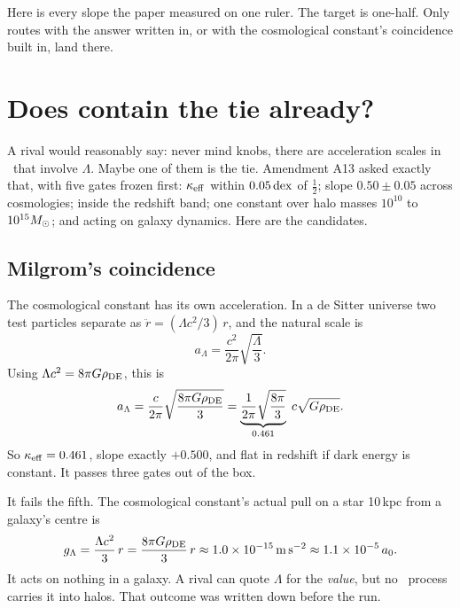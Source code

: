 Here is every slope the paper measured on one ruler. The target is one-half. Only routes with the answer written in, or with the cosmological constant's coincidence built in, land there.





\section{Does \texorpdfstring{\LCDM}{LCDM} contain the tie already?}

A rival would reasonably say: never mind knobs, there are acceleration scales in \LCDM\ that involve $\Lambda$. Maybe one of them is the tie. Amendment A13 asked exactly that, with five gates frozen first: $\kappa_{\rm eff}$ within $0.05\,\mathrm{dex}$ of $\tfrac12$; slope $0.50\pm0.05$ across cosmologies; inside the redshift band; one constant over halo masses $10^{10}$ to $10^{15}M_\odot$; and acting on galaxy dynamics. Here are the candidates.

\subsection{Milgrom's coincidence}

The cosmological constant has its own acceleration. In a de Sitter universe two test particles separate as $\ddot r=(\Lambda c^2/3)\,r$, and the natural scale is
\begin{equation}
a_\Lambda=\frac{c^2}{2\pi}\sqrt{\frac{\Lambda}{3}}.
\end{equation}
Using $\Lambda c^2=8\pi G\rho_{\rm DE}$, this is
\begin{equation}
a_\Lambda=\frac{c}{2\pi}\sqrt{\frac{8\pi G\rho_{\rm DE}}{3}}=\underbrace{\frac{1}{2\pi}\sqrt{\frac{8\pi}{3}}}_{0.461}\;c\sqrt{G\rho_{\rm DE}}.
\end{equation}
So $\kappa_{\rm eff}=0.461$, slope exactly $+0.500$, and flat in redshift if dark energy is constant. It passes three gates out of the box.

It fails the fifth. The cosmological constant's actual pull on a star 10\,kpc from a galaxy's centre is
\begin{equation}
g_\Lambda=\frac{\Lambda c^2}{3}\,r=\frac{8\pi G\rho_{\rm DE}}{3}\,r\approx1.0\times10^{-15}\,\mathrm{m\,s^{-2}}\approx1.1\times10^{-5}\,a_0.
\end{equation}
It acts on nothing in a galaxy. A rival can quote $\Lambda$ for the \emph{value}, but no \LCDM\ process carries it into halos. That outcome was written down before the run.

